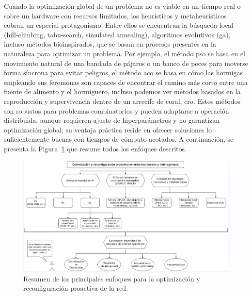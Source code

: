 Cuando la optimización global de un problema no es viable en un tiempo real o sobre un hardware con recursos limitados, los heurísticos y metaheurísticos cobran un especial protagonismo. Entre ellos se encuentran la búsqueda local~\cite{lourencco2003iterated} (hill-climbing, tabu-search, simulated annealing), algoritmos evolutivos (\gls{ga}), incluso métodos bioinspirados, que se basan en procesos presentes en la naturaleza para optimizar un problema. Por ejemplo, el método \gls{pso} se basa en el movimiento natural de una bandada de pájaros o un banco de peces para moverse forma síncrona para evitar peligros, el método \gls{aco} se basa en cómo las hormigas empleando sus feromonas son capaces de encontrar el camino más corto entre una fuente de alimento y el hormiguero, incluso podemos ver métodos basados en la reproducción y supervivencia dentro de un arrecife de coral, \gls{cro}. Estos métodos son robustos para problemas combinatorios y pueden adaptarse a operación distribuida, aunque requieren ajuste de hiperparámetros y no garantizan optimización global; su ventaja práctica reside en ofrecer soluciones lo suficientemente buenas con tiempos de cómputo acotados. A continuación, se presenta la Figura~\ref{fig:sota_10_modelos} que resume todos los enfoques descritos. 



\begin{figure}
   \centering
   \includegraphics[width=\textwidth]{fig/02_sota/sota_10_modelos.drawio.pdf}
   \caption{Resumen de los principales enfoques para la optimización y reconfiguración proactiva de la red.}
   \label{fig:sota_10_modelos}
\end{figure}



